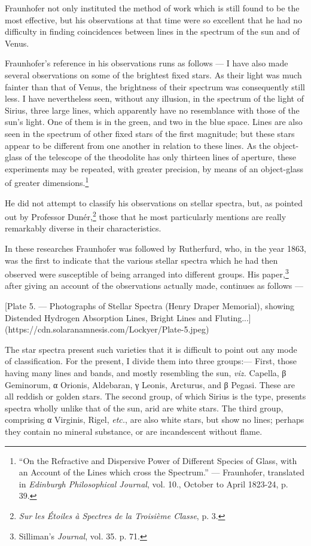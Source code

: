 \documentclass[a4paper, 12pt, oneside, polutonikogreek, english]{article}
\begin{document}
Fraunhofer not only instituted the method of work which is still found to be the most effective, but his observations at that time were so excellent that he had no difficulty in finding coincidences between lines in the spectrum of the sun and of Venus.

Fraunhofer's reference in his observations runs as follows --- I have also made several observations on some of the brightest fixed stars. As their light was much fainter than that of Venus, the brightness of their spectrum was consequently still less. I have nevertheless seen, without any illusion, in the spectrum of the light of Sirius, three large lines, which apparently have no resemblance with those of the sun's light. One of them is in the green, and two in the blue space. Lines are also seen in the spectrum of other fixed stars of the first magnitude; but these stars appear to be different from one another in relation to these lines. As the object-glass of the telescope of the theodolite has only thirteen lines of aperture, these experiments may be repeated, with greater precision, by means of an object-glass of greater dimensions.\footnote{``On the Refractive and Dispersive Power of Different Species of Glass, with an Account of the Lines which cross the Spectrum.'' --- Fraunhofer, translated in \emph{Edinburgh Philosophical Journal}, vol. 10., October to April 1823-24, p. 39.}

He did not attempt to classify his observations on stellar spectra, but, as pointed out by Professor Dunér,\footnote{\emph{Sur les Étoiles à Spectres de la Troisième Classe}, p. 3.} those that he most particularly mentions are really remarkably diverse in their characteristics.

In these researches Fraunhofer was followed by Rutherfurd, who, in the year 1863, was the first to indicate that the various stellar spectra which he had then observed were susceptible of being arranged into different groups. His paper,\footnote{Silliman's \emph{Journal}, vol. 35. p. 71.} after giving an account of the observations actually made, continues as follows ---

[Plate 5. --- Photographs of Stellar Spectra (Henry Draper Memorial), showing Distended Hydrogen Absorption Lines, Bright Lines and Fluting...](https://cdn.solaranamnesis.com/Lockyer/Plate-5.jpeg)

The star spectra present such varieties that it is difficult to point out any mode of classification. For the present, I divide them into three groups:--- First, those having many lines and bands, and mostly resembling the sun, \emph{viz.} Capella, β Geminorum, α Orionis, Aldebaran, γ Leonis, Arcturus, and β Pegasi. These are all reddish or golden stars. The second group, of which Sirius is the type, presents spectra wholly unlike that of the sun, arid are white stars. The third group, comprising α Virginis, Rigel, \emph{etc.}, are also white stars, but show no lines; perhaps they contain no mineral substance, or are incandescent without flame.
\end{document}
